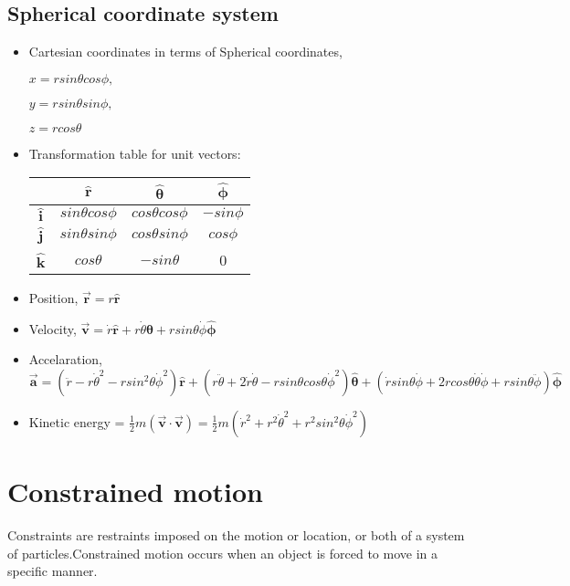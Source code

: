 \documentclass{article}
\newcommand{\uvec}[1]{\bm{\hat{#1}}}
\begin{document}
\subsection{Spherical coordinate system}
\begin{itemize}
    \item Cartesian coordinates in terms of Spherical coordinates,
    \begin{center}
        $x = rsin\theta cos\phi,$ 
        
        $y = rsin\theta sin\phi,$ 
        
        $z = rcos\theta$
    \end{center}
    \item Transformation table for unit vectors:
    \begin{center}
    \begin{tabular}{ c | c | c | c}
                   & $\uvec{r}$ & $\uvec{\theta}$ & $\uvec{\phi}$\\
        \hline
        $\uvec{i}$ & $sin\theta cos\phi $ & $cos\theta cos\phi$ & $-sin\phi$\\
        \hline  
        $\uvec{j}$ & $sin\theta sin\phi $ & $cos\theta sin\phi$ & $cos\phi$\\
        \hline
        $\uvec{k}$ & $cos\theta$ & $-sin\theta$ & 0\\
    \end{tabular}
    \end{center}
    \item Position, $\bm{\vec{r}} = r\uvec{r}$
    \item Velocity, $\bm{\vec{v}} = \dot{r}\uvec{r} + r\dot{\theta}\uvec{\theta} + rsin\theta\dot{\phi}\uvec{\phi}$
    \item Accelaration, $\bm{\vec{a}} = (\ddot{r} - r\dot{\theta}^2 - rsin^2\theta\dot{\phi}^2)\uvec{r} + (r\ddot{\theta} + 2\dot{r}\dot{\theta} - rsin\theta cos\theta\dot{\phi}^2)\uvec{\theta} + (\dot{r}sin\theta\dot{\phi} + 2rcos\theta\dot{\theta}\dot{\phi} + rsin\theta\ddot{\phi})\uvec{\phi}$
    \item Kinetic energy = $\frac{1}{2}m(\bm{\vec{v}\cdot\vec{v}}) = \frac{1}{2}m(\dot{r}^2 + r^2\dot{\theta}^2 + r^2sin^2\theta\dot{\phi}^2)$
\end{itemize}

\newpage
\section*{Constrained motion}
Constraints are restraints imposed on the motion or location, 
or both of a system of particles.Constrained motion occurs when 
an object is forced to move in a specific manner.
\end{document}
